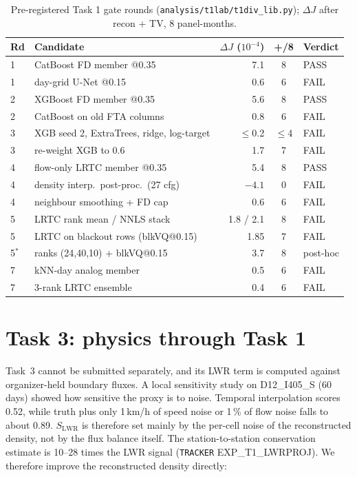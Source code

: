 \documentclass[conference,10pt]{IEEEtran}
\newcommand{\file}[1]{\texttt{\small #1}}
\newcommand{\dJ}{\Delta J}
\begin{document}
\begin{table}[t]
\centering
\caption{Pre-registered Task 1 gate rounds (\file{analysis/t1lab/t1div\_lib.py}); $\dJ$ after recon + TV, 8 panel-months.}
\label{tab:gates}
\footnotesize\setlength{\tabcolsep}{3pt}
\begin{tabular}{@{}llrcl@{}}
\toprule
Rd & Candidate & $\dJ$ ($10^{-4}$) & +/8 & Verdict \\
\midrule
1 & CatBoost FD member @0.35 & 7.1 & 8 & PASS \\
1 & day-grid U-Net @0.15 & 0.6 & 6 & FAIL \\
2 & XGBoost FD member @0.35 & 5.6 & 8 & PASS \\
2 & CatBoost on old FTA columns & 0.8 & 6 & FAIL \\
3 & XGB seed 2, ExtraTrees, ridge, log-target & $\le$0.2 & $\le$4 & FAIL \\
3 & re-weight XGB to 0.6 & 1.7 & 7 & FAIL \\
4 & flow-only LRTC member @0.35 & 5.4 & 8 & PASS \\
4 & density interp.\ post-proc.\ (27 cfg) & $-4.1$ & 0 & FAIL \\
4 & neighbour smoothing + FD cap & 0.6 & 6 & FAIL \\
5 & LRTC rank mean / NNLS stack & 1.8 / 2.1 & 8 & FAIL \\
5 & LRTC on blackout rows (blkVQ@0.15) & 1.85 & 7 & FAIL \\
5$^*$ & ranks (24,40,10) + blkVQ@0.15 & 3.7 & 8 & post-hoc \\
7 & kNN-day analog member & 0.5 & 6 & FAIL \\
7 & 3-rank LRTC ensemble & 0.4 & 6 & FAIL \\
\bottomrule
\end{tabular}
\end{table}

\section{Task 3: physics through Task 1}\label{sec:t3}
Task~3 cannot be submitted separately, and its LWR term is computed against organizer-held boundary fluxes.
A local sensitivity study on D12\_I405\_S (60 days) showed how sensitive the proxy is to noise. Temporal interpolation scores 0.52, while truth plus only 1\,km/h of
speed noise or 1\,\% of flow noise falls to about 0.89. $S_\text{LWR}$ is therefore set mainly by the per-cell noise of the
reconstructed density, not by the flux balance itself. The station-to-station conservation estimate is 10--28 times the LWR
signal (\file{TRACKER} EXP\_T1\_LWRPROJ). We therefore improve the reconstructed density directly:
\end{document}
